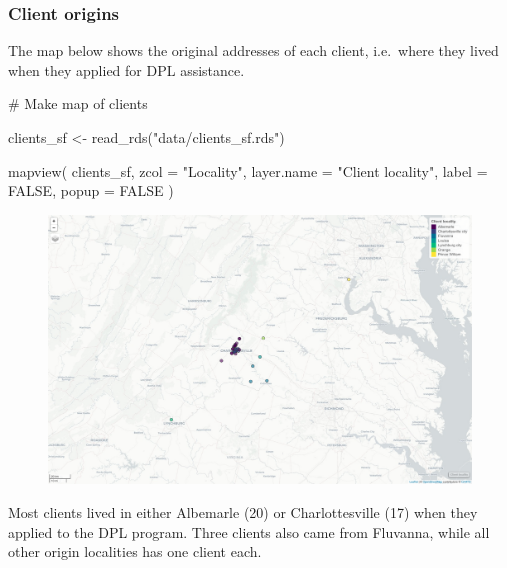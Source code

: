 \documentclass[
  letterpaper,
  DIV=11,
  numbers=noendperiod]{scrartcl}
\newenvironment{Shaded}{\begin{snugshade}}{\end{snugshade}}
\newcommand{\AttributeTok}[1]{\textcolor[rgb]{0.40,0.45,0.13}{#1}}
\newcommand{\CommentTok}[1]{\textcolor[rgb]{0.37,0.37,0.37}{#1}}
\newcommand{\ConstantTok}[1]{\textcolor[rgb]{0.56,0.35,0.01}{#1}}
\newcommand{\FunctionTok}[1]{\textcolor[rgb]{0.28,0.35,0.67}{#1}}
\newcommand{\NormalTok}[1]{\textcolor[rgb]{0.00,0.23,0.31}{#1}}
\newcommand{\OtherTok}[1]{\textcolor[rgb]{0.00,0.23,0.31}{#1}}
\newcommand{\StringTok}[1]{\textcolor[rgb]{0.13,0.47,0.30}{#1}}
\begin{document}
\hypertarget{client-origins}{%
\subsubsection{Client origins}\label{client-origins}}

The map below shows the original addresses of each client, i.e.~where
they lived when they applied for DPL assistance.

\begin{Shaded}
\begin{Highlighting}[]
\CommentTok{\# Make map of clients}

\NormalTok{clients\_sf }\OtherTok{\textless{}{-}} \FunctionTok{read\_rds}\NormalTok{(}\StringTok{"data/clients\_sf.rds"}\NormalTok{)}

\FunctionTok{mapview}\NormalTok{(}
\NormalTok{  clients\_sf,}
  \AttributeTok{zcol =} \StringTok{"Locality"}\NormalTok{,}
  \AttributeTok{layer.name =} \StringTok{"Client locality"}\NormalTok{,}
  \AttributeTok{label =} \ConstantTok{FALSE}\NormalTok{,}
  \AttributeTok{popup =} \ConstantTok{FALSE}
\NormalTok{)}
\end{Highlighting}
\end{Shaded}

\begin{figure}[H]

{\centering \includegraphics{piedmont_files/figure-pdf/clients-map-1.pdf}

}

\end{figure}

Most clients lived in either Albemarle (20) or Charlottesville (17) when
they applied to the DPL program. Three clients also came from Fluvanna,
while all other origin localities has one client each.
\end{document}
